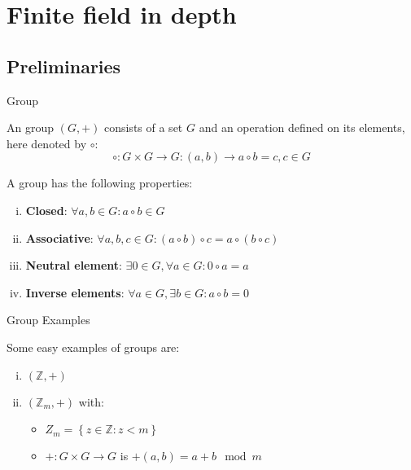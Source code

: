 \section{Finite field in depth}

\subsection{Preliminaries}

\begin{frame}[t]{Group}
	
	An group \cite{Paar2010understanding} $(G, +)$ consists of a set $G$ and an operation defined on its elements, here denoted by $\circ$:
	\[\circ: G \times G \to G : (a, b) \to a \circ b = c, c \in G\]
	
	A group has the following properties: 
	
	\begin{enumerate}[i.]
		\item \textbf{Closed}: $\forall a, b \in G: a \circ b \in G$
		\item \textbf{Associative}: $\forall a, b, c \in G: (a \circ b) \circ c = a \circ (b \circ c)$
		\item \textbf{Neutral element}: $\exists 0 \in G, \forall a \in G: 0 \circ a = a$
		\item \textbf{Inverse elements}: $\forall a \in G, \exists b \in G: a \circ b = 0$
	\end{enumerate}

\end{frame}

\begin{frame}[t]{Group Examples}
	
	Some easy examples of groups are:
	
	\medskip
	
	\begin{enumerate}[i.]
		\item $\left( \mathbb{Z}, +\right)$
		\item $\left( \mathbb{Z}_m, +\right)$ with:
			\begin{itemize}
				\item $Z_m = \left\{z \in \mathbb{Z}: z < m \right\}$
				\item $+: G \times G \to G$ is $+(a, b) = a + b \mod m$
			\end{itemize}  
	\end{enumerate}
	
\end{frame}

